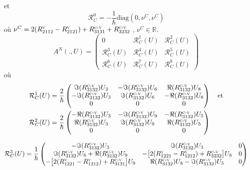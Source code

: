 \documentclass[a4paper,12pt]{article} %
\begin{document}
et 
$$ \mathcal{R}^{0}_{C} =- \dfrac{1}{\hbar}  \textrm{diag}(0,\nu^{C}, \nu^{C})$$
où \quad
  $ \nu^{C} = 2(R^{\textsc{v}}_{2112}-R^{\textsc{v}}_{2121})+R^{\textsc{c-v}}_{3131} + R^{\textsc{c-v}}_{3232} $ , $ \nu^{C} \in \mathbb{R}. $\\
\begin{equation}\label{matrice AN}
A^{N}(.,U)=
\begin{pmatrix}
0 & \mathcal{R}^{1}_{C}(U) & \mathcal{R}^{2}_{C}(U)\\
\mathcal{R}^{3}_{C}(U) & \mathcal{R}^{4}_{C}(U) & \mathcal{R}^{5}_{C}(U) \\
\mathcal{R}^{6}_{C}(U) & \mathcal{R}^{7}_{C}(U)&\mathcal{R}^{8}_{C}(U)
\end{pmatrix}
\end{equation}
 où
  \begin{eqnarray*}
 \begin{split}
\mathcal{R}^{1}_{C}(U) &= \dfrac{2}{\hbar}
\begin{pmatrix}
\Im(R^{\textsc{c-v}}_{3132})U_{3}& -\Im(R^{\textsc{c-v}}_{3132})U_{6} & \Re(R^{\textsc{c-v}}_{3132})U_{8}\\
-\Im(R^{\textsc{c-v}}_{3132})U_{3}& \Im(R^{\textsc{c-v}}_{3132})U_{6}& -\Re(R^{\textsc{c-v}}_{3132})U_{8}\\
            0 &                               0 & 0
\end{pmatrix} \quad \textrm{et} \\
\mathcal{R}^{2}_{C}(U) &= \dfrac{2}{\hbar}
\begin{pmatrix}
-\Re(R^{\textsc{c-v}}_{3132})U_{3} & -\Im(R^{\textsc{c-v}}_{3132})U_{9} & -\Re(R^{\textsc{c-v}}_{3132})U_{5}\\
\Re(R^{\textsc{c-v}}_{3132})U_{3} & \Im(R^{\textsc{c-v}}_{3132})U_{9} & \Re(R^{\textsc{c-v}}_{3132})U_{5}\\
            0 &                               0 & 0
\end{pmatrix}
\end{split}
\end{eqnarray*}

 \begin{eqnarray*}
\begin{split}
\mathcal{R}^{3}_{C}(U)&= \dfrac{1}{\hbar}
\begin{pmatrix}
-\Im(R^{\textsc{c-v}}_{3132})U_{3} & \Im(R^{\textsc{c-v}}_{3132})U_{3} & 0\\
\Im(R^{\textsc{c-v}}_{3132})U_{6}+\Re(R^{\textsc{c-v}}_{3132})U_{9} &
-\big[2(R^{\textsc{v}}_{1221}-R^{\textsc{v}}_{1212})+R^{\textsc{c-v}}_{3232}\big]U_{8} & 0 \\
-\big[2(R^{\textsc{v}}_{1221}-R^{\textsc{v}}_{1212})+R^{\textsc{c-v}}_{3131}\big]U_{9} & 
\Re(R^{\textsc{c-v}}_{3132})U_{8}- \Im(R^{\textsc{c-v}}_{3132})U_{5} & 0
\end{pmatrix}\\
\end{split}
\end{eqnarray*}
\end{document}
